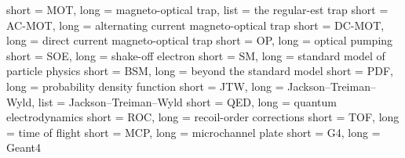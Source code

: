 % 
% 
% 

{
	short = MOT,
	long = magneto-optical trap,
	list = the regular-est trap
}
{
	short = AC-MOT,
	long = alternating current magneto-optical trap
}
{
	short = DC-MOT,
	long = direct current magneto-optical trap
}
{
	short = OP,
	long = optical pumping
}
{
	short = SOE,
	long = shake-off electron
}
{
	short = SM,
	long = standard model of particle physics
}
{
	short = BSM,
	long = beyond the standard model
}
{
	short = PDF,
	long = probability density function
}
{
	short = JTW,
	long = Jackson--Treiman--Wyld,
	list = Jackson--Treiman--Wyld \cite{jtw}\cite{jtw_coulomb}
}
{
	short = QED,
	long = quantum electrodynamics
}
{
	short = ROC,
	long = recoil-order corrections
}
{
	short = TOF,
	long = time of flight
}
{
	short = MCP,
	long = microchannel plate
}
{
	short = G4,
	long = Geant4
}















